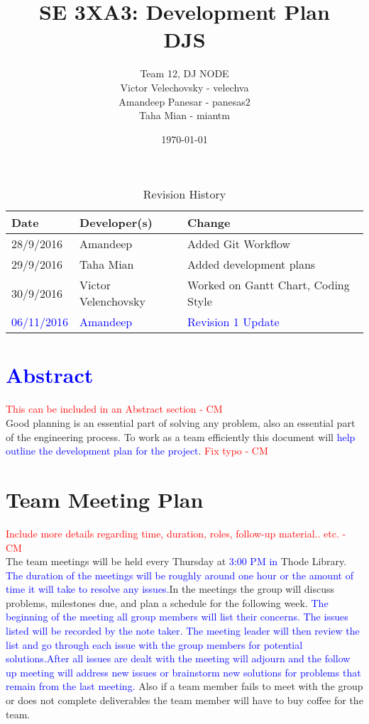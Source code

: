 \documentclass{article}
\title{SE 3XA3: Development Plan\\DJS}
\author{Team 12, DJ NODE
		\\ Victor Velechovsky - velechva
		\\ Amandeep Panesar - panesas2
		\\ Taha Mian - miantm
}
\date{\today}
\begin{document}
\begin{table}[hp]
\caption{Revision History} \label{TblRevisionHistory}
\begin{tabularx}{\textwidth}{llX}
\toprule
\textbf{Date} & \textbf{Developer(s)} & \textbf{Change}\\
\midrule
28/9/2016 & Amandeep & Added Git Workflow\\
29/9/2016 & Taha Mian & Added development plans\\
30/9/2016 & Victor Velenchovsky  & Worked on Gantt Chart, Coding Style\\
\textcolor{blue}{06/11/2016} & \textcolor{blue}{Amandeep} & \textcolor{blue}{Revision 1 Update}\\
\bottomrule
\end{tabularx}
\end{table}

\newpage

\maketitle
\section{\textcolor{blue}{Abstract}}
\textcolor{red}{ This can be included in an Abstract section - CM} \\
Good planning is an essential part of solving any problem, also an essential part of the engineering process. To work as a team efficiently this document will \textcolor{blue}{help outline the development plan for the project}.\textcolor{red}{ Fix typo - CM}

\section{Team Meeting Plan}
\textcolor{red}{Include more details regarding time, duration, roles, follow-up material.. etc. - CM} \\
The team meetings will be held every Thursday at \textcolor{blue}{3:00 PM in} Thode Library. \textcolor{blue}{The duration of the meetings will be roughly around one hour or the amount of time it will take to resolve any issues.}In the meetings the group will discuss problems, milestones due, and plan a schedule for the following week. \textcolor{blue}{The beginning of the meeting all group members will list their concerns. The issues listed will be recorded by the note taker. The meeting leader will then review the list and go through each issue with the group members for potential solutions.After all issues are dealt with the meeting will adjourn and the follow up meeting will address new issues or brainstorm new solutions for problems that remain from the last meeting.} Also if a team member fails to meet with the group or does not complete deliverables the team member will have to buy coffee for the team.
\end{document}

